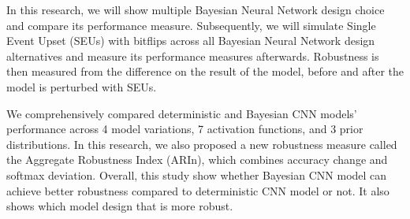 
In this research, we will show multiple Bayesian Neural Network design choice and compare its performance measure. Subsequently, we will simulate Single Event Upset (SEUs) with bitflips across all Bayesian Neural Network design alternatives and measure its performance measures afterwards. Robustness is then measured from the difference on the result of the model, before and after the model is perturbed with SEUs.

We comprehensively compared deterministic and Bayesian CNN models' performance across 4 model variations, 7 activation functions, and 3 prior distributions.  In this research, we also proposed a new robustness measure called the Aggregate Robustness Index (ARIn), which combines accuracy change and softmax deviation. Overall, this study show whether Bayesian CNN model can achieve better robustness compared to deterministic CNN model or not. It also shows which model design that is more robust.








